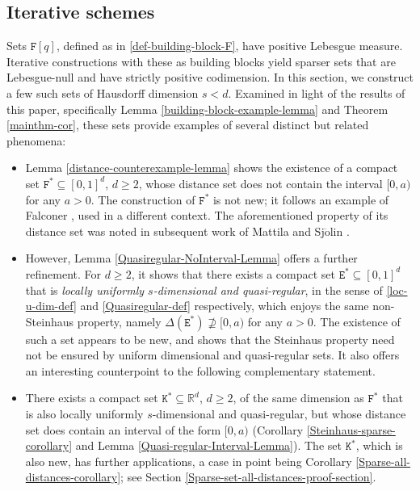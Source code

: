 \documentclass[a4paper,11pt]{amsart}
\numberwithin{equation}{section}
\begin{document}
\subsection{Iterative schemes} 
Sets $\mathtt F[q]$, defined as in \eqref{def-building-block-F}, have positive Lebesgue measure. Iterative constructions with these as building blocks yield sparser sets that are Lebesgue-null and have strictly positive codimension. In this section, we construct a few such sets of Hausdorff dimension $s < d$. Examined in light of the results of this paper, specifically Lemma \ref{building-block-example-lemma} and Theorem \ref{mainthm-cor}, these sets provide examples of several distinct but related phenomena:
\begin{itemize} 
\item Lemma \ref{distance-counterexample-lemma} shows the existence of a compact set $\mathtt F^{\ast} \subseteq [0,1]^d$, $d \geq 2$, whose distance set does not contain the interval $[0, a)$ for any $a > 0$. The construction of $\mathtt F^{\ast}$ is not new; it follows an example of Falconer \cite[Theorem 2.4]{Falconer-1986}, used in a different context.  The aforementioned property of its distance set was noted in subsequent work of Mattila and Sj${\ddot{\text{o}}}$lin \cite{Mattila-Sjolin-99}.
\vskip0.1in
\item However, Lemma \ref{Quasiregular-NoInterval-Lemma} offers a further refinement. For $d \geq 2$, it shows that there exists a compact set $\mathtt E^{\ast} \subseteq [0,1]^d$ that is {\em{locally uniformly $s$-dimensional and quasi-regular}}, in the sense of \eqref{loc-u-dim-def} and \eqref{Quasiregular-def} respectively, which enjoys the same non-Steinhaus property, namely $\Delta(\mathtt E^{\ast}) \not\supseteq [0, a)$ for any $a > 0$. The existence of such a set appears to be new, and shows that the Steinhaus property need not be ensured by uniform dimensional and quasi-regular sets. It also offers an interesting counterpoint to the following complementary statement.  
\vskip0.1in   
\item There exists a compact set $\mathtt K^{\ast} \subseteq \mathbb R^d$, $d \geq 2$, of the same dimension as $\mathtt F^{\ast}$ that is also locally uniformly $s$-dimensional and quasi-regular, but whose distance set does contain an interval of the form $[0, a)$ (Corollary \ref{Steinhaus-sparse-corollary} and Lemma \ref{Quasi-regular-Interval-Lemma}).  The set $\mathtt K^{\ast}$, which is also new, has further applications, a case in point being Corollary \ref{Sparse-all-distances-corollary}; see Section \ref{Sparse-set-all-distances-proof-section}. 
\end{itemize}  
   
\end{document}
